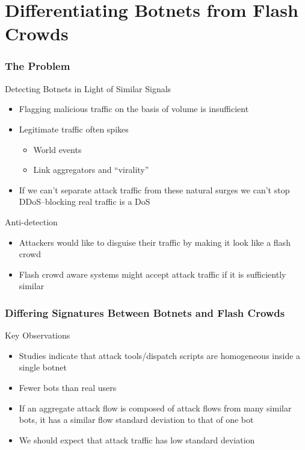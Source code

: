 \documentclass[10pt,mathserif]{beamer}
\begin{document}
\section{Differentiating Botnets from Flash Crowds}
\begin{frame}
  \frametitle{The Problem}
  \begin{block}{Detecting Botnets in Light of Similar Signals}
    \begin{itemize}
    \item Flagging malicious traffic on the basis of volume is
      insufficient
    \item Legitimate traffic often spikes
      \begin{itemize}
      \item World events
      \item Link aggregators and ``virality''
      \end{itemize}
    \item If we can't separate attack traffic from these natural surges
      we can't stop DDoS--blocking real traffic is a DoS
    \end{itemize}
  \end{block}
  \begin{block}{Anti-detection}
    \begin{itemize}
    \item Attackers would like to disguise their traffic by making it
      look like a flash crowd
    \item Flash crowd aware systems might accept attack traffic if it is
      sufficiently similar
    \end{itemize}
  \end{block}
\end{frame}

\begin{frame}
  \frametitle{Differing Signatures Between Botnets and Flash Crowds}
  \begin{block}{Key Observations}
    \begin{itemize}
    \item Studies indicate that attack tools/dispatch scripts are
      homogeneous inside a single botnet
    \item Fewer bots than real users
    \item If an aggregate attack flow is composed of attack flows from
      many similar bots, it has a similar flow standard deviation to that of one
      bot
    \item We should expect that attack traffic has low standard deviation
    \end{itemize}
  \end{block}
\end{frame}
\end{document}

